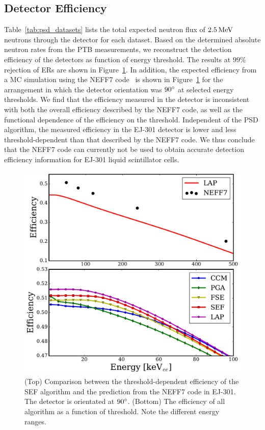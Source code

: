 \subsection{Detector Efficiency}

Table~\ref{tab:psd_datasets} lists the total expected neutron flux of $2.5\,\mathrm{MeV}$ neutrons through the detector for each dataset. Based on the determined absolute neutron rates from the PTB measurements, we reconstruct the detection efficiency of the detectors as function of energy threshold. The results at $99\%$ rejection of ERs are shown in Figure~\ref{fig:psd_efficiencies}. In addition, the expected efficiency from a MC simulation using the NEFF7 code~\cite{Dietze:1982} is shown in Figure~\ref{fig:psd_efficiencies} for the arrangement in which the detector orientation was $90{}^{\circ}$ at selected energy thresholds. We find that the efficiency measured in the detector is inconsistent with both the overall efficiency described by the NEFF7 code, as well as the functional dependence of the efficiency on the threshold. Independent of the PSD algorithm, the measured efficiency in the EJ-301 detector is lower and less threshold-dependent than that described by the NEFF7 code. We thus conclude that the NEFF7 code can currently not be used to obtain accurate detection efficiency information for EJ-301 liquid scintillator cells.

\begin{figure}[htb]
\centering
    \includegraphics[width = \textwidth]{figures/psd/fig_efficiency}
    \caption{(Top) Comparison between the threshold-dependent efficiency of the SEF algorithm and the prediction from the NEFF7 code in EJ-301. The detector is orientated at $90{}^{\circ}$. (Bottom) The efficiency of all algorithm as a function of threshold. Note the different energy ranges.}\label{fig:psd_efficiencies}
\end{figure}

